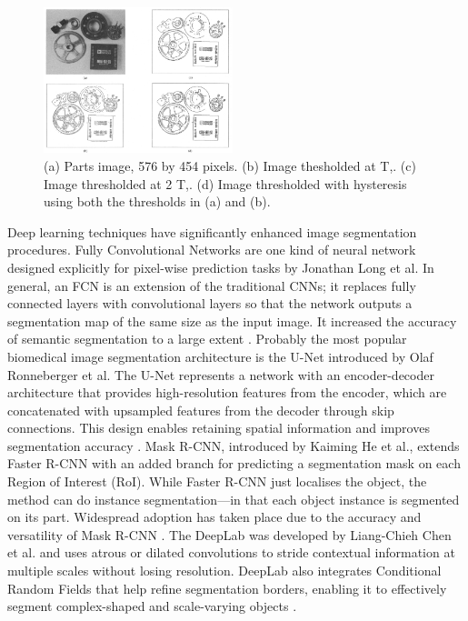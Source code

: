     \begin{figure}[htbp]
        \centering
        \includegraphics[width=0.49\textwidth]{figures/canny.png}
        \caption{(a) Parts image, 576 by 454 pixels. (b) Image thesholded at T,. (c) Image thresholded at 2 T,. (d) Image thresholded with hysteresis using both the thresholds in (a) and (b). \citep{canny1986computational}}
        \label{fig:canny}
    \end{figure}

    Deep learning techniques have significantly enhanced image segmentation procedures. Fully Convolutional Networks are one kind of neural network designed explicitly for pixel-wise prediction tasks by Jonathan Long et al. In general, an FCN is an extension of the traditional CNNs; it replaces fully connected layers with convolutional layers so that the network outputs a segmentation map of the same size as the input image. It increased the accuracy of semantic segmentation to a large extent \citep{long2015fully}. Probably the most popular biomedical image segmentation architecture is the U-Net introduced by Olaf Ronneberger et al. The U-Net represents a network with an encoder-decoder architecture that provides high-resolution features from the encoder, which are concatenated with upsampled features from the decoder through skip connections. This design enables retaining spatial information and improves segmentation accuracy \citep{ronneberger2015u}. Mask R-CNN, introduced by Kaiming He et al., extends Faster R-CNN with an added branch for predicting a segmentation mask on each Region of Interest (RoI). While Faster R-CNN just localises the object, the method can do instance segmentation—in that each object instance is segmented on its part. Widespread adoption has taken place due to the accuracy and versatility of Mask R-CNN \citep{he2017mask}. The DeepLab was developed by Liang-Chieh Chen et al. and uses atrous or dilated convolutions to stride contextual information at multiple scales without losing resolution. DeepLab also integrates Conditional Random Fields that help refine segmentation borders, enabling it to effectively segment complex-shaped and scale-varying objects \citep{chen2017deeplab}.\\

